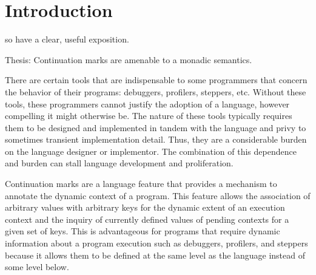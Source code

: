 \documentclass[ms]{byuprop} %
\begin{document}



\section{Introduction}

so have a clear, useful exposition.

Thesis: Continuation marks are amenable to a monadic semantics.


There are certain tools that are indispensable to some programmers that concern the
behavior of their programs: debuggers, profilers, steppers, etc. Without these tools,
these programmers cannot justify the adoption of a language, however compelling it might
otherwise be. The nature of these tools typically requires them to be designed and
implemented in tandem with the language and privy to sometimes transient implementation
detail. Thus, they are a considerable burden on the language designer or implementor. The
combination of this dependence and burden can stall language development and proliferation.

Continuation marks \cite{clements2006portable} are a language feature that provides a
mechanism to annotate the dynamic context of a program. This feature allows the
association of arbitrary values with arbitrary keys for the dynamic extent of an execution
context and the inquiry of currently defined values of pending contexts for a given set of
keys. This is advantageous for programs that require dynamic information about a program
execution such as debuggers, profilers, and steppers because it allows them to be defined
at the same level as the language instead of some level below.


\end{document}
